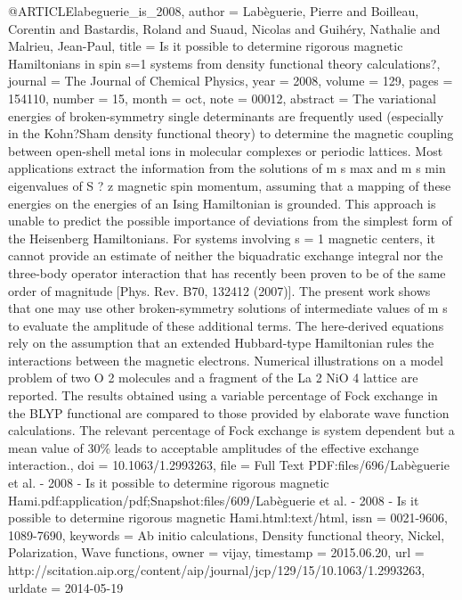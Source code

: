 @ARTICLE{labeguerie_is_2008,
  author = {Labèguerie, Pierre and Boilleau, Corentin and Bastardis, Roland and
	Suaud, Nicolas and Guihéry, Nathalie and Malrieu, Jean-Paul},
  title = {Is it possible to determine rigorous magnetic {Hamiltonians} in spin
	s=1 systems from density functional theory calculations?},
  journal = {The Journal of Chemical Physics},
  year = {2008},
  volume = {129},
  pages = {154110},
  number = {15},
  month = oct,
  note = {00012},
  abstract = {The variational energies of broken-symmetry single determinants are
	frequently used (especially in the Kohn?Sham density functional theory)
	to determine the magnetic coupling between open-shell metal ions
	in molecular complexes or periodic lattices. Most applications extract
	the information from the solutions of m s max and m s min eigenvalues
	of S ? z magnetic spin momentum, assuming that a mapping of these
	energies on the energies of an Ising Hamiltonian is grounded. This
	approach is unable to predict the possible importance of deviations
	from the simplest form of the Heisenberg Hamiltonians. For systems
	involving s = 1 magnetic centers, it cannot provide an estimate of
	neither the biquadratic exchange integral nor the three-body operator
	interaction that has recently been proven to be of the same order
	of magnitude [Phys. Rev. B70, 132412 (2007)]. The present work shows
	that one may use other broken-symmetry solutions of intermediate
	values of m s to evaluate the amplitude of these additional terms.
	The here-derived equations rely on the assumption that an extended
	Hubbard-type Hamiltonian rules the interactions between the magnetic
	electrons. Numerical illustrations on a model problem of two O 2
	molecules and a fragment of the La 2 NiO 4 lattice are reported.
	The results obtained using a variable percentage of Fock exchange
	in the BLYP functional are compared to those provided by elaborate
	wave function calculations. The relevant percentage of Fock exchange
	is system dependent but a mean value of 30\% leads to acceptable
	amplitudes of the effective exchange interaction.},
  doi = {10.1063/1.2993263},
  file = {Full Text PDF:files/696/Labèguerie et al. - 2008 - Is it possible to determine rigorous magnetic Hami.pdf:application/pdf;Snapshot:files/609/Labèguerie et al. - 2008 - Is it possible to determine rigorous magnetic Hami.html:text/html},
  issn = {0021-9606, 1089-7690},
  keywords = {Ab initio calculations, Density functional theory, Nickel, Polarization,
	Wave functions},
  owner = {vijay},
  timestamp = {2015.06.20},
  url = {http://scitation.aip.org/content/aip/journal/jcp/129/15/10.1063/1.2993263},
  urldate = {2014-05-19}
}


